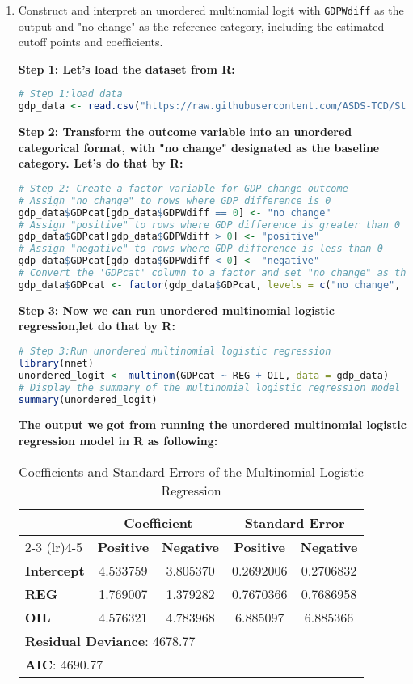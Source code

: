 \documentclass[12pt,letterpaper]{article}
\begin{document}
\begin{enumerate}
	\item Construct and interpret an unordered multinomial logit with \texttt{GDPWdiff} as the output and "no change" as the reference category, including the estimated cutoff points and coefficients.
 
\textbf{ Step 1: Let's load the dataset from R:}
 \begin{lstlisting}[language=R]
# Step 1:load data
gdp_data <- read.csv("https://raw.githubusercontent.com/ASDS-TCD/StatsII_Spring2024/main/datasets/gdpChange.csv", stringsAsFactors = F)
\end{lstlisting}
\textbf{Step 2: Transform the outcome variable into an unordered categorical format, with "no change" designated as the baseline category. Let's do that by R:}
\begin{lstlisting}[language=R]
# Step 2: Create a factor variable for GDP change outcome
# Assign "no change" to rows where GDP difference is 0
gdp_data$GDPcat[gdp_data$GDPWdiff == 0] <- "no change"
# Assign "positive" to rows where GDP difference is greater than 0
gdp_data$GDPcat[gdp_data$GDPWdiff > 0] <- "positive"
# Assign "negative" to rows where GDP difference is less than 0
gdp_data$GDPcat[gdp_data$GDPWdiff < 0] <- "negative"
# Convert the 'GDPcat' column to a factor and set "no change" as the reference level
gdp_data$GDPcat <- factor(gdp_data$GDPcat, levels = c("no change", "positive", "negative"))
\end{lstlisting}
 \textbf{Step 3: Now we can run unordered multinomial logistic regression,let do that by R:}
 \begin{lstlisting}[language=R]
# Step 3:Run unordered multinomial logistic regression
library(nnet)
unordered_logit <- multinom(GDPcat ~ REG + OIL, data = gdp_data)
# Display the summary of the multinomial logistic regression model
summary(unordered_logit)
\end{lstlisting}
\textbf{The output we got from running the unordered multinomial logistic regression model in R as following:}
\begin{table}[ht]
\centering
\caption{Coefficients and Standard Errors of the Multinomial Logistic Regression}
\begin{tabular}{lcccc}
\toprule
& \multicolumn{2}{c}{\textbf{Coefficient}} & \multicolumn{2}{c}{\textbf{Standard Error}} \\
\cmidrule(lr){2-3} \cmidrule(lr){4-5}
& \textbf{Positive} & \textbf{Negative} & \textbf{Positive} & \textbf{Negative} \\
\midrule
\textbf{Intercept} & 4.533759 & 3.805370 & 0.2692006 & 0.2706832 \\
\textbf{REG}       & 1.769007 & 1.379282 & 0.7670366 & 0.7686958 \\
\textbf{OIL}       & 4.576321 & 4.783968 & 6.885097  & 6.885366  \\
\midrule
\multicolumn{5}{l}{\textbf{Residual Deviance}: 4678.77} \\
\multicolumn{5}{l}{\textbf{AIC}: 4690.77} \\
\bottomrule
\end{tabular}
\end{table}


\end{enumerate}
\end{document}
